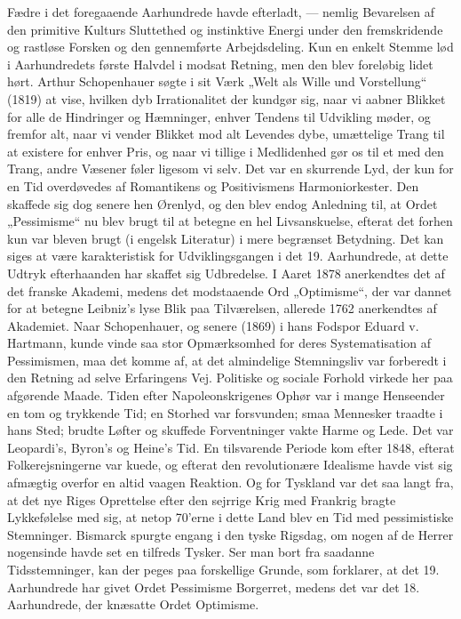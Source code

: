\documentclass[12pt,a4paper,openany]{book}
\newcommand{\opage}[1]{\marginnote{\footnotesize\textit{[#1]}}}
\begin{document}
Fædre i det foregaaende Aarhundrede havde efterladt, --- nemlig
Bevarelsen af den primitive Kulturs Sluttethed og instinktive
Energi under den fremskridende og rastløse Forsken og den gennemførte
Arbejdsdeling. Kun en enkelt Stemme lød i Aarhundredets
første Halvdel i modsat Retning, men den blev foreløbig lidet hørt.
Arthur Schopenhauer søgte i sit Værk „Welt als Wille und Vorstellung“
(1819) at vise, hvilken dyb Irrationalitet der kundgør sig, naar
vi aabner Blikket for alle de Hindringer og Hæmninger, enhver Tendens
til Udvikling møder, og fremfor alt, naar vi vender Blikket
mod alt Levendes dybe, umættelige Trang til at existere for enhver
Pris, og naar vi tillige i Medlidenhed gør os til et med den Trang,
andre Væsener føler ligesom vi selv. Det var en skurrende Lyd, der
kun for en Tid overdøvedes af Romantikens og Positivismens Harmoniorkester.
Den skaffede sig dog senere hen Ørenlyd, og den blev
endog Anledning til, at Ordet „Pessimisme“ nu blev brugt til at betegne
en hel Livsanskuelse, efterat det forhen kun var bleven brugt
(i engelsk Literatur) i mere begrænset Betydning. Det kan siges at
være karakteristisk for Udviklingsgangen i det 19. Aarhundrede, at
dette Udtryk efterhaanden har skaffet sig Udbredelse. I Aaret 1878
anerkendtes det af det franske Akademi, medens det modstaaende
Ord „Optimisme“, der var dannet for at betegne Leibniz’s lyse Blik
paa Tilværelsen, allerede 1762 anerkendtes af Akademiet. Naar Schopenhauer,
og senere (1869) i hans Fodspor Eduard v. Hartmann,
kunde vinde saa stor Opmærksomhed for deres Systematisation af
Pessimismen, maa det komme af, at det almindelige Stemningsliv
var forberedt i den Retning ad selve Erfaringens Vej. Politiske og
sociale Forhold virkede her paa afgørende Maade. Tiden efter Napoleonskrigenes
Ophør var i mange Henseender en tom og trykkende
Tid; en Storhed var forsvunden; smaa Mennesker traadte i
hans Sted; brudte Løfter og skuffede Forventninger vakte Harme
og Lede. Det var Leopardi’s, Byron’s og Heine’s Tid. En tilsvarende
Periode kom efter 1848, efterat Folkerejsningerne var kuede, og
efterat den revolutionære Idealisme havde vist sig afmægtig overfor
en altid vaagen Reaktion. Og for Tyskland var det saa langt
fra, at det nye Riges Oprettelse efter den sejrrige Krig med Frankrig
bragte Lykkefølelse med sig, at netop 70'erne i dette Land blev en
Tid med pessimistiske Stemninger. Bismarck spurgte engang i den
tyske Rigsdag, om nogen af de Herrer nogensinde havde set en tilfreds
Tysker. Ser man bort fra saadanne Tidsstemninger, kan der
\opage{155}peges paa forskellige Grunde, som forklarer, at det 19. Aarhundrede
har givet Ordet Pessimisme Borgerret, medens det var det 18. Aarhundrede,
der knæsatte Ordet Optimisme.
\end{document}
